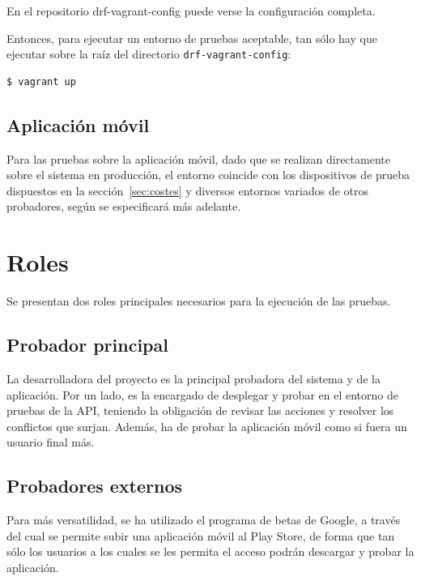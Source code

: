 En el repositorio drf-vagrant-config puede verse la configuración completa.

Entonces, para ejecutar un entorno de pruebas aceptable, tan sólo hay que
ejecutar sobre la raíz del directorio \texttt{drf-vagrant-config}:

\begin{verbatim}
$ vagrant up
\end{verbatim}


\subsection{Aplicación móvil}

Para las pruebas sobre la aplicación móvil, dado que se realizan directamente
sobre el sistema en producción, el entorno coincide con los dispositivos de
prueba dispuestos en la sección~\ref{sec:costes} y diversos entornos variados de
otros probadores, según se especificará más adelante.


\section{Roles}

Se presentan dos roles principales necesarios para la ejecución de las pruebas.

\subsection{Probador principal}

La desarrolladora del proyecto es la principal probadora del sistema y de la
aplicación. Por un lado, es la encargado de desplegar y probar en el entorno
de pruebas de la API, teniendo la obligación de revisar las acciones y resolver
los conflictos que surjan. Además, ha de probar la aplicación móvil como si
fuera un usuario final más.

\subsection{Probadores externos}

Para más versatilidad, se ha utilizado el programa de betas de Google, a través
del cual se permite subir una aplicación móvil al Play Store, de forma que tan
sólo los usuarios a los cuales se les permita el acceso podrán descargar y
probar la aplicación.

